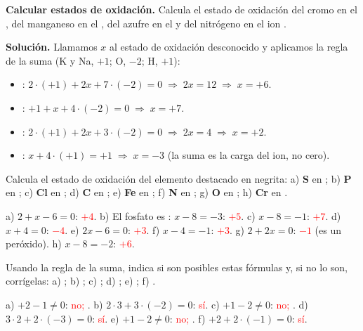 \begin{example}
    \textbf{Calcular estados de oxidación.} Calcula el estado de oxidación del cromo en el , del manganeso en el
    , del azufre en el  y del nitrógeno en el ion .

    \textbf{Solución.} Llamamos \(x\) al estado de oxidación desconocido y aplicamos la regla de la suma (K y Na, \(+1\);
    O, \(-2\); H, \(+1\)):
    \begin{itemize}
        \item {}: \(2 \cdot (+1) + 2x + 7 \cdot (-2) = 0 \;\Rightarrow\; 2x = 12 \;\Rightarrow\; x = +6\).
        \item {}: \(+1 + x + 4 \cdot (-2) = 0 \;\Rightarrow\; x = +7\).
        \item {}: \(2 \cdot (+1) + 2x + 3 \cdot (-2) = 0 \;\Rightarrow\; 2x = 4 \;\Rightarrow\; x = +2\).
        \item {}: \(x + 4 \cdot (+1) = +1 \;\Rightarrow\; x = -3\) (la suma es la carga del ion, no cero).
    \end{itemize}
\end{example}

\begin{exercise}
    Calcula el estado de oxidación del elemento destacado en negrita: a) \textbf{S} en ; b) \textbf{P} en ;
    c) \textbf{Cl} en ; d) \textbf{C} en ; e) \textbf{Fe} en ; f) \textbf{N} en ; g)
    \textbf{O} en ; h) \textbf{Cr} en .
    \begin{solu}
        a) \(2 + x - 6 = 0\): \textcolor{red}{\(+4\)}. b) El fosfato es : \(x - 8 = -3\): \textcolor{red}{\(+5\)}.
        c) \(x - 8 = -1\): \textcolor{red}{\(+7\)}. d) \(x + 4 = 0\): \textcolor{red}{\(-4\)}. e) \(2x - 6 = 0\):
        \textcolor{red}{\(+3\)}. f) \(x - 4 = -1\): \textcolor{red}{\(+3\)}. g) \(2 + 2x = 0\): \textcolor{red}{\(-1\)} (es un
        peróxido). h) \(x - 8 = -2\): \textcolor{red}{\(+6\)}.
    \end{solu}
\end{exercise}

\begin{exercise}
    Usando la regla de la suma, indica si son posibles estas fórmulas y, si no lo son, corrígelas: a) ; b) ;
    c) ; d) ; e) ; f) .
    \begin{solu}
        a) \(+2 - 1 \neq 0\): \textcolor{red}{no; }. b) \(2 \cdot 3 + 3 \cdot (-2) = 0\): \textcolor{red}{sí}.
        c) \(+1 - 2 \neq 0\): \textcolor{red}{no; }. d) \(3 \cdot 2 + 2 \cdot (-3) = 0\): \textcolor{red}{sí}.
        e) \(+1 - 2 \neq 0\): \textcolor{red}{no; }. f) \(+2 + 2 \cdot (-1) = 0\): \textcolor{red}{sí}.
    \end{solu}
\end{exercise}

